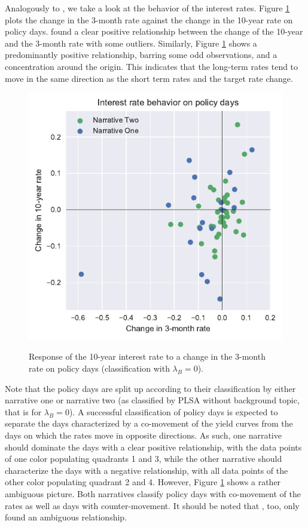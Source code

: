 \documentclass[11pt,a4paper,english,oneside]{book}
\numberwithin{equation}{chapter}
\begin{document}
Analogously to \citet[pp. 14 -- 15]{Ellingsen.2003}, we take a look at the behavior of the interest rates. Figure \ref{Change01} plots the change in the 3-month rate against the change in the 10-year rate on policy days. \citet[p. 14]{Ellingsen.2003} found a clear positive relationship between the change of the 10-year and the 3-month rate with some outliers. Similarly, Figure \ref{Change01} shows a predominantly positive relationship, barring some odd observations, and a concentration around the origin. This indicates that the long-term rates tend to move in the same direction as the short term rates and the target rate change. 

\begin{figure}
	\caption{Response of the 10-year interest rate to a change in the 3-month rate on policy days (classification with $\lambda_B=0$).}
	\centering
	\includegraphics[scale=1]{Images/ChangePlot_L0_0.pdf}
	\label{Change01}
\end{figure}

Note that the policy days are split up according to their classification by either narrative one or narrative two (as classified by PLSA without background topic, that is for $\lambda_B=0$). A successful classification of policy days is expected to separate the days characterized by a co-movement of the yield curves from the days on which the rates move in opposite directions. As such, one narrative should dominate the days with a clear positive relationship, with the data points of one color populating quadrants 1 and 3, while the other narrative should characterize the days with a negative relationship, with all data points of the other color populating quadrant 2 and 4. However, Figure \ref{Change01} shows a rather ambiguous picture. Both narratives classify policy days with co-movement of the rates as well as days with counter-movement.  It should be noted that \citet[pp. 14--15]{Ellingsen.2003}, too, only found an ambiguous relationship.
\end{document}
